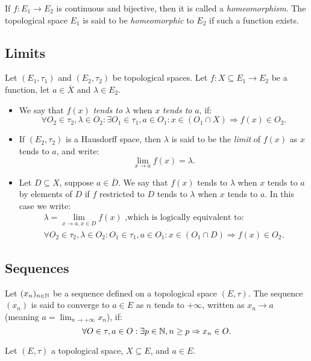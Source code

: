 \begin{definition}
	If $f: E_1 \to E_2$ is continuous and bijective, then it is called a \emph{homeomorphism}. The topological space $E_1$ is said to be \emph{homeomorphic} to $E_2$ if such a function exists. 
\end{definition}

\subsection{Limits}

\begin{definition}
	Let $(E_1, \tau_1)$ and $(E_2, \tau_2)$ be topological spaces. Let $f : X \subseteq E_1 \to E_2$ be a function, let $a \in \overline X$ and $\lambda \in E_2$.
	\begin{itemize}
		\item
		We say that $f(x)$ \emph{tends to} $\lambda$ when $x$ \emph{tends to} $a$, if:
		\begin{equation*}
		\forall O_2 \in \tau_2, \lambda \in O_2:  \exists O_1 \in \tau_1, a \in O_1 : x \in (O_1 \cap X) \Rightarrow f(x) \in O_2.
		\end{equation*}
		\item
		If $(E_2, \tau_2)$ is a Hausdorff space, then $\lambda$ is said to be the \emph{limit} of $f(x)$ as $x$ tends to $a$, and write:
		\begin{equation*}
			\lim_{x \to a} f(x) = \lambda.
		\end{equation*}
		\item
			Let $D \subseteq X$, suppose $a \in \overline D$. We say that $f(x)$ tends to $\lambda$ when $x$ tends to $a$ by elements of $D$ if $f$ restricted to $D$ tends to $\lambda$ when $x$ tends to $a$. In this case we write:
		\begin{gather*}
			\lambda = \lim_{x \to a, x \in D} f(x)	\text{ ,which is logically equivalent to:} \\ \forall O_2 \in \tau_2, \lambda \in O_2 : O_1 \in \tau_1, a \in O_1: x \in (O_1 \cap D) \Rightarrow f(x) \in O_2.
		\end{gather*}
	\end{itemize}
	\end{definition}

\subsection{Sequences}

\begin{definition}
	Let $(x_n)_{n \in \mathbb{N}}$	be a sequence defined on a topological space $(E, \tau)$. The sequence $(x_n)$ is said to converge to $a \in E$ as $n$ tends to $+ \infty$, written as $x_n \to a$ (meaning $a = \lim_{n \to + \infty} x_n $), if:
	\begin{equation*}
	\forall O \in \tau, a \in O: \exists p \in \mathbb{N}, n \geq p \Rightarrow x_n \in O.	
	\end{equation*}
\end{definition}

\begin{theorem}
	Let $(E, \tau)$ a topological space, $X \subseteq E$, and $a \in E$.
\end{theorem}
